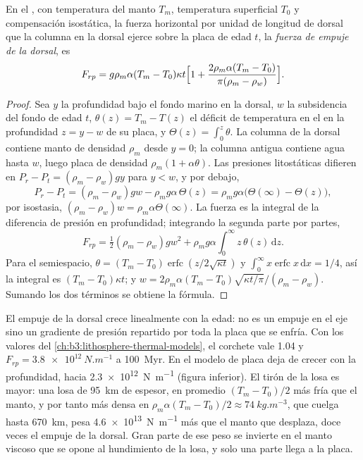 \begin{proposition}\label{prop:b3:mantle-convection:ridge-push}
En el , con temperatura del manto $T_m$, temperatura superficial
$T_0$ y compensación isostática, la fuerza horizontal por unidad
de longitud de dorsal que la columna en la dorsal ejerce sobre la placa de edad $t$,
la \emph{fuerza de empuje de la dorsal}, es
\[
  F_{rp} = g\rho_m\alpha(T_m - T_0)\kappa t\Bigl[1 + \frac{2\rho_m\alpha(T_m
  - T_0)}{\pi(\rho_m - \rho_w)}\Bigr].
\]
\end{proposition}

\begin{proof}
Sea $y$ la profundidad bajo el fondo marino en la dorsal, $w$ la subsidencia del
fondo de edad $t$, $\theta(z) = T_m - T(z)$ el déficit de temperatura en el
en la profundidad $z = y - w$ de su placa, y $\Theta(z) = \int_0^z\theta$. La
columna de la dorsal contiene manto de densidad $\rho_m$ desde $y = 0$; la columna antigua
contiene agua hasta $w$, luego placa de densidad $\rho_m(1 + \alpha\theta)$. Las
presiones litostáticas difieren en $P_r - P_t = (\rho_m - \rho_w)gy$ para $y < w$,
y por debajo,
\[
  P_r - P_t = (\rho_m - \rho_w)gw - \rho_mg\alpha\,\Theta(z)
  = \rho_mg\alpha\bigl(\Theta(\infty) - \Theta(z)\bigr),
\]
por isostasia, $(\rho_m - \rho_w)w = \rho_m\alpha\Theta(\infty)$. La fuerza es la
integral de la diferencia de presión en profundidad; integrando la segunda parte por
partes,
\[
  F_{rp} = \tfrac12(\rho_m - \rho_w)gw^2 + \rho_mg\alpha\int_0^\infty
  z\,\theta(z)\,\mathrm dz .
\]
Para el semiespacio, $\theta = (T_m - T_0)\operatorname{erfc}(z/2\sqrt{\kappa
t})$ y $\int_0^\infty x\operatorname{erfc}x\,\mathrm dx = 1/4$, así la
integral es $(T_m - T_0)\kappa t$; y $w = 2\rho_m\alpha(T_m -
T_0)\sqrt{\kappa t/\pi}/(\rho_m - \rho_w)$. Sumando los dos términos se obtiene la
fórmula.
\end{proof}

El empuje de la dorsal crece linealmente con la edad: no es un empuje en el eje sino un
gradiente de presión repartido por toda la placa que se enfría. Con los valores del
\cref{ch:b3:lithosphere-thermal-models}, el corchete vale 1.04 y $F_{rp} =
\qty{3.8e12}{N.m^{-1}}$ a \qty{100}{Myr}. En el modelo de placa deja de crecer
con la profundidad, hacia \qty{2.3e12}{N.m^{-1}} (figura inferior). El tirón de la losa es
mayor: una losa de \qty{95}{km} de espesor, en promedio $(T_m - T_0)/2$ más fría que el
manto, y por tanto más densa en $\rho_m\alpha(T_m - T_0)/2 \approx
\qty{74}{kg.m^{-3}}$, que cuelga hasta \qty{670}{km}, pesa
\qty{4.6e13}{N.m^{-1}} más que el manto que desplaza, doce veces el
empuje de la dorsal. Gran parte de ese peso se invierte en el manto viscoso que se opone al
hundimiento de la losa, y solo una parte llega a la placa.

